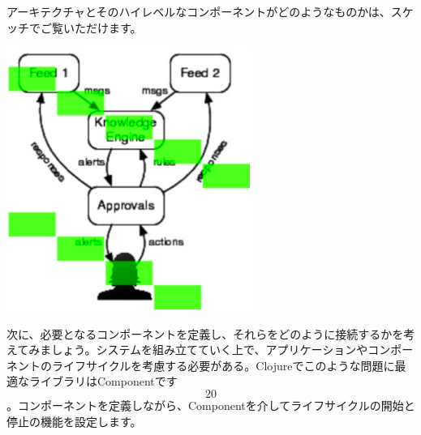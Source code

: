 アーキテクチャとそのハイレベルなコンポーネントがどのようなものかは、スケッチでご覧いただけます。 

\includegraphics[width=8cm]{fig_07_001.eps}

次に、必要となるコンポーネントを定義し、それらをどのように接続するかを考えてみましょう。システムを組み立てていく上で、アプリケーションやコンポーネントのライフサイクルを考慮する必要がある。Clojureでこのような問題に最適なライブラリはComponentです\[20\]。コンポーネントを定義しながら、Componentを介してライフサイクルの開始と停止の機能を設定します。










